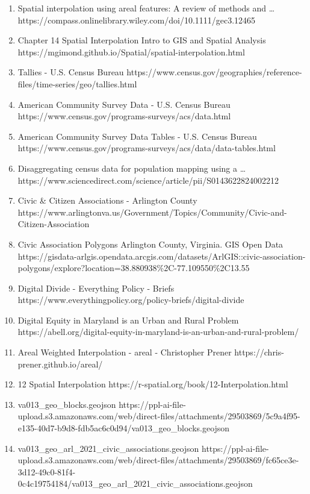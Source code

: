 \documentclass[
  letterpaper,
  DIV=11,
  numbers=noendperiod]{scrartcl}
\begin{document}
\begin{enumerate}
\item
  Spatial interpolation using areal features: A review of methods and
  \ldots{}
  https://compass.onlinelibrary.wiley.com/doi/10.1111/gec3.12465
\item
  Chapter 14 Spatial Interpolation \textbar{} Intro to GIS and Spatial
  Analysis https://mgimond.github.io/Spatial/spatial-interpolation.html
\item
  Tallies - U.S. Census Bureau
  https://www.census.gov/geographies/reference-files/time-series/geo/tallies.html
\item
  American Community Survey Data - U.S. Census Bureau
  https://www.census.gov/programs-surveys/acs/data.html
\item
  American Community Survey Data Tables - U.S. Census Bureau
  https://www.census.gov/programs-surveys/acs/data/data-tables.html
\item
  Disaggregating census data for population mapping using a \ldots{}
  https://www.sciencedirect.com/science/article/pii/S0143622824002212
\item
  Civic \& Citizen Associations - Arlington County
  https://www.arlingtonva.us/Government/Topics/Community/Civic-and-Citizen-Association
\item
  Civic Association Polygons \textbar{} Arlington County, Virginia. GIS
  Open Data
  https://gisdata-arlgis.opendata.arcgis.com/datasets/ArlGIS::civic-association-polygons/explore?location=38.880938\%2C-77.109550\%2C13.55
\item
  Digital Divide - Everything Policy - Briefs
  https://www.everythingpolicy.org/policy-briefs/digital-divide
\item
  Digital Equity in Maryland is an Urban and Rural Problem
  https://abell.org/digital-equity-in-maryland-is-an-urban-and-rural-problem/
\item
  Areal Weighted Interpolation - areal - Christopher Prener
  https://chris-prener.github.io/areal/
\item
  12 Spatial Interpolation
  https://r-spatial.org/book/12-Interpolation.html
\item
  va013\_geo\_blocks.geojson
  https://ppl-ai-file-upload.s3.amazonaws.com/web/direct-files/attachments/29503869/5c9a4f95-e135-40d7-b9d8-fdb5ac6c0d94/va013\_geo\_blocks.geojson
\item
  va013\_geo\_arl\_2021\_civic\_associations.geojson
  https://ppl-ai-file-upload.s3.amazonaws.com/web/direct-files/attachments/29503869/fc65ce3e-3d12-49c0-81f4-0c4c19754184/va013\_geo\_arl\_2021\_civic\_associations.geojson

\end{enumerate}
\end{document}
